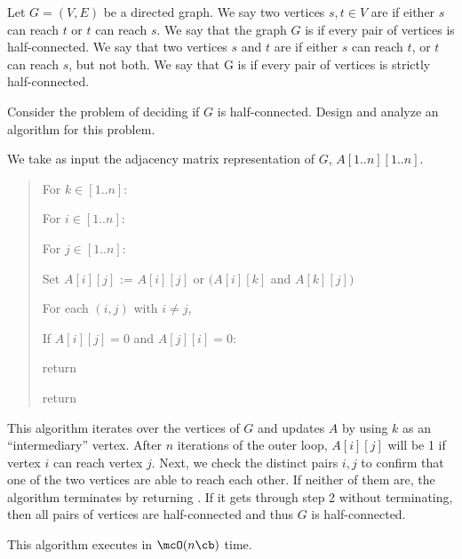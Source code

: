 \documentclass{article}
\begin{document}
 Let \( G = (V, E) \) be a directed graph. We say two vertices \( s, t \in V \) are  if either \( s \) can reach \( t \) or \( t \) can reach \( s \).
We say that the graph \( G \) is  if every pair of vertices is half-connected.
We say that two vertices \( s \) and \( t \) are  if either \( s \) can reach \( t \), or \( t \) can reach \( s \), but not both.
We say that G is  if every pair of vertices is strictly half-connected.
\setcounter{section}{6}
\setcounter{exercise}{5}
\begin{subexercise}
Consider the problem of deciding if \( G \) is half-connected.
Design and analyze an algorithm for this problem.
\end{subexercise}

\begin{solution}
We take as input the adjacency matrix representation of \( G \), \( A[1..n][1..n] \).
\begin{quote}
\begin{steps}
  \item For \( k\in [1..n] \): \begin{steps}
    \item For \( i\in [1..n] \): \begin{steps}
      \item For \( j\in [1..n] \): \begin{steps}
        \item Set \( A[i][j] \) := \( A[i][j] \) or \( (A[i][k] \) and \( A[k][j]) \)
      \end{steps}
    \end{steps}
  \end{steps}
  \item For each \( (i,j) \) with \( i\neq j \), \begin{steps}
    \item If \( A[i][j] = 0 \) and \( A[j][i] = 0 \): \begin{steps}
      \item return \boolF
    \end{steps}
  \end{steps}
  \item return \boolT
\end{steps}
\end{quote}
This algorithm iterates over the vertices of \( G \) and updates \( A \) by using \( k \) as an ``intermediary'' vertex.
After \( n \) iterations of the outer loop, \( A[i][j] \) will be 1 if vertex \( i \) can reach vertex \( j \).
Next, we check the distinct pairs \( i,j \) to confirm that one of the two vertices are able to reach each other.
If neither of them are, the algorithm terminates by returning \boolF.
If it gets through step 2 without terminating, then all pairs of vertices are half-connected and thus \( G \) is half-connected.

This algorithm executes in \( \mcO(n\cb) \) time.
\end{solution}
\pagebreak
\end{document}

